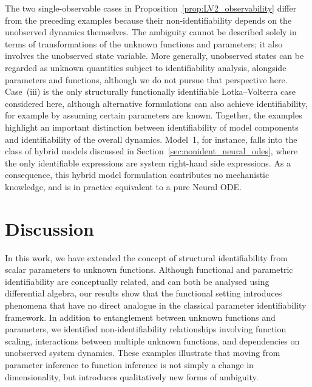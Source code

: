 \documentclass{article}
\theoremstyle{plain}
\theoremstyle{definition}
\begin{document}
{The two single-observable cases in Proposition~\ref{prop:LV2_observability} differ from the preceding examples because their non-identifiability depends on the unobserved dynamics themselves. The ambiguity cannot be described solely in terms of transformations of the unknown functions and parameters; it also involves the unobserved state variable. More generally, unobserved states can be regarded as unknown quantities subject to identifiability analysis, alongside parameters and functions, although we do not pursue that perspective here. Case~(iii) is the only structurally functionally identifiable Lotka--Volterra case considered here, although alternative formulations can also achieve identifiability, for example by assuming certain parameters are known. Together, the examples highlight an important distinction between identifiability of model components and identifiability of the overall dynamics. Model~1, for instance, falls into the class of hybrid models discussed in Section~\ref{sec:nonident_neural_odes}, where the only identifiable expressions are system right-hand side expressions. As a consequence, this hybrid model formulation contributes no mechanistic knowledge, and is in practice equivalent to a pure Neural ODE.


\section{Discussion} \label{sec:discussion}

In this work, we have extended the concept of structural identifiability from scalar parameters to unknown functions. Although functional and parametric identifiability are conceptually related, and can both be analysed using differential algebra, our results show that the functional setting introduces phenomena that have no direct analogue in the classical parameter identifiability framework. In addition to entanglement between unknown functions and parameters, we identified non-identifiability relationships involving function scaling, interactions between multiple unknown functions, and dependencies on unobserved system dynamics. These examples illustrate that moving from parameter inference to function inference is not simply a change in dimensionality, but introduces qualitatively new forms of ambiguity.

}
\end{document}
